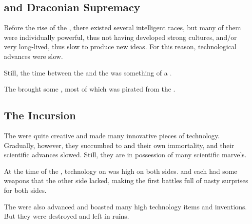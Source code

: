








\subsection{\Saphyrae and Draconian Supremacy}
Before the rise of the \resphain, there existed several intelligent races, but many of them were individually powerful, thus not having developed strong cultures, and/or very long-lived, thus slow to produce new ideas. For this reason, technological advances were slow. 

Still, the time between the \firstbanewar{} and the \secondbanewar{} was something of a . 

The \banes{} brought some , most of which was pirated from the \voyagers{}.









\subsection{The Incursion}
The \resphain{} were quite creative and made many innovative pieces of technology. Gradually, however, they succumbed to  and their own immortality, and their scientific advances slowed. Still, they are in possession of many scientific marvels. 

At the time of the \secondbanewar, technology on \Miith was high on both sides. 
\Miithians and \resphain each had some weapons that the other side lacked, making the first battles full of nasty surprises for both sides. 

The  were also advanced and boasted many high technology items and inventions. 
But they were destroyed and left in ruins. 





